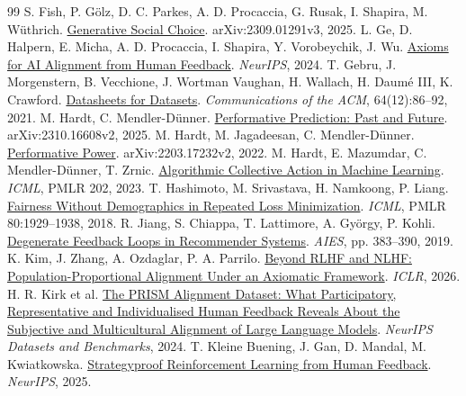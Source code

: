 {\begin{thebibliography}{99}
 S. Fish, P. G\"olz, D. C. Parkes, A. D. Procaccia, G. Rusak, I. Shapira, M. W\"uthrich. \href{https://arxiv.org/abs/2309.01291v3}{Generative Social Choice}. arXiv:2309.01291v3, 2025.
 L. Ge, D. Halpern, E. Micha, A. D. Procaccia, I. Shapira, Y. Vorobeychik, J. Wu. \href{https://proceedings.neurips.cc/paper_files/paper/2024/file/9328208f88ec69420031647e6ff97727-Paper-Conference.pdf}{Axioms for AI Alignment from Human Feedback}. \emph{NeurIPS}, 2024.
 T. Gebru, J. Morgenstern, B. Vecchione, J. Wortman Vaughan, H. Wallach, H. Daum\'e III, K. Crawford. \href{https://arxiv.org/abs/1803.09010v8}{Datasheets for Datasets}. \emph{Communications of the ACM}, 64(12):86--92, 2021.
 M. Hardt, C. Mendler-D\"unner. \href{https://arxiv.org/abs/2310.16608v2}{Performative Prediction: Past and Future}. arXiv:2310.16608v2, 2025.
 M. Hardt, M. Jagadeesan, C. Mendler-D\"unner. \href{https://arxiv.org/abs/2203.17232v2}{Performative Power}. arXiv:2203.17232v2, 2022.
 M. Hardt, E. Mazumdar, C. Mendler-D\"unner, T. Zrnic. \href{https://proceedings.mlr.press/v202/hardt23a.html}{Algorithmic Collective Action in Machine Learning}. \emph{ICML}, PMLR 202, 2023.
 T. Hashimoto, M. Srivastava, H. Namkoong, P. Liang. \href{https://proceedings.mlr.press/v80/hashimoto18a.html}{Fairness Without Demographics in Repeated Loss Minimization}. \emph{ICML}, PMLR 80:1929--1938, 2018.
 R. Jiang, S. Chiappa, T. Lattimore, A. Gy\"orgy, P. Kohli. \href{https://doi.org/10.1145/3306618.3314288}{Degenerate Feedback Loops in Recommender Systems}. \emph{AIES}, pp. 383--390, 2019.
 K. Kim, J. Zhang, A. Ozdaglar, P. A. Parrilo. \href{https://arxiv.org/abs/2506.05619}{Beyond RLHF and NLHF: Population-Proportional Alignment Under an Axiomatic Framework}. \emph{ICLR}, 2026.
 H. R. Kirk et al. \href{https://arxiv.org/abs/2404.16019}{The PRISM Alignment Dataset: What Participatory, Representative and Individualised Human Feedback Reveals About the Subjective and Multicultural Alignment of Large Language Models}. \emph{NeurIPS Datasets and Benchmarks}, 2024.
 T. Kleine Buening, J. Gan, D. Mandal, M. Kwiatkowska. \href{https://arxiv.org/abs/2503.09561}{Strategyproof Reinforcement Learning from Human Feedback}. \emph{NeurIPS}, 2025.

\end{thebibliography}}
